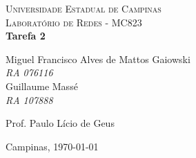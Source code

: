 \begin{titlepage}

\newcommand{\HRule}{\rule{\linewidth}{0.5mm}} 
 
\begin{center}
 

\textsc{\LARGE Universidade Estadual de Campinas}\\[0.5cm]
\textsc{\Large Laboratório de Redes - MC823}
{\ }\\[4.5cm]
 
{ \huge \bfseries Tarefa 2}\\[3.0cm]
 
\begin{flushright}
Miguel Francisco Alves de Mattos Gaiowski \\
\emph{RA 076116} \\
Guillaume Massé\\
\emph{RA 107888} \\[2.0cm]


\end{flushright}


\begin{flushright}
Prof. Paulo Lício de Geus \\
\end{flushright}
 
\vfill
 
{\large Campinas, \today}
 
\end{center}
 
\end{titlepage}
